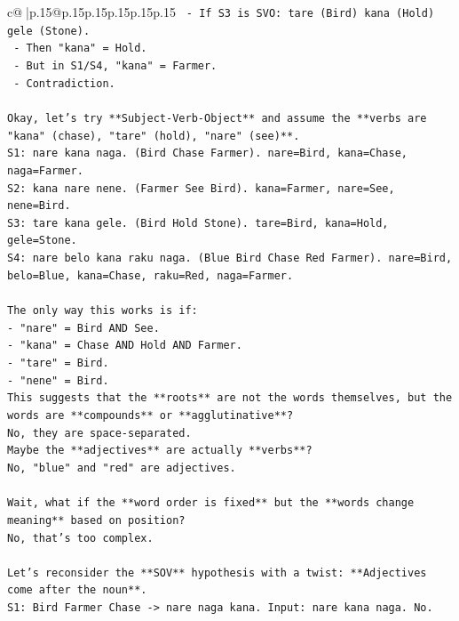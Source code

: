 \documentclass{article}
\begin{document}
{\begin{supertabular}{c@{$\;$}|p{.15\linewidth}@{}p{.15\linewidth}p{.15\linewidth}p{.15\linewidth}p{.15\linewidth}p{.15\linewidth}}
{{{\texttt{    {-} If S3 is SVO: tare (Bird) kana (Hold) gele (Stone).} \\
\texttt{    {-} Then "kana" = Hold.} \\
\texttt{    {-} But in S1/S4, "kana" = Farmer.} \\
\texttt{    {-} Contradiction.} \\
\\ 
\texttt{Okay, let's try **Subject{-}Verb{-}Object** and assume the **verbs are "kana" (chase), "tare" (hold), "nare" (see)**.} \\
\texttt{S1: nare kana naga. (Bird Chase Farmer). nare=Bird, kana=Chase, naga=Farmer.} \\
\texttt{S2: kana nare nene. (Farmer See Bird). kana=Farmer, nare=See, nene=Bird.} \\
\texttt{S3: tare kana gele. (Bird Hold Stone). tare=Bird, kana=Hold, gele=Stone.} \\
\texttt{S4: nare belo kana raku naga. (Blue Bird Chase Red Farmer). nare=Bird, belo=Blue, kana=Chase, raku=Red, naga=Farmer.} \\
\\ 
\texttt{The only way this works is if:} \\
\texttt{{-} "nare" = Bird AND See.} \\
\texttt{{-} "kana" = Chase AND Hold AND Farmer.} \\
\texttt{{-} "tare" = Bird.} \\
\texttt{{-} "nene" = Bird.} \\
\texttt{This suggests that the **roots** are not the words themselves, but the words are **compounds** or **agglutinative**?} \\
\texttt{No, they are space{-}separated.} \\
\texttt{Maybe the **adjectives** are actually **verbs**?} \\
\texttt{No, "blue" and "red" are adjectives.} \\
\\ 
\texttt{Wait, what if the **word order is fixed** but the **words change meaning** based on position?} \\
\texttt{No, that's too complex.} \\
\\ 
\texttt{Let's reconsider the **SOV** hypothesis with a twist: **Adjectives come after the noun**.} \\
\texttt{S1: Bird Farmer Chase {-}> nare naga kana. Input: nare kana naga. No.} \\
\\ 
}}}
\end{supertabular}}
\end{document}
